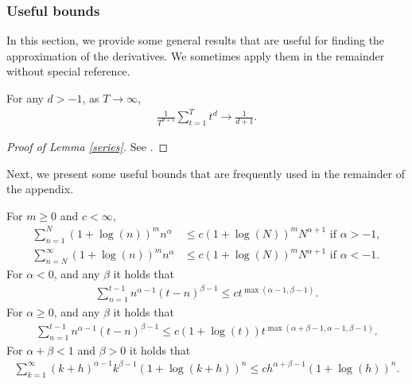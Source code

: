{{\subsubsection{Useful bounds}\label{UB} 
In this section, we provide some general results that are useful for finding the approximation of the derivatives. We sometimes apply them in the remainder without special reference.

\begin{lemma} \label{series}
    For any $d>-1$, as $T\rightarrow \infty$,
    \begin{align}
        \frac{1}{T^{d+1}} \sum_{t = 1}^T t^d \rightarrow \frac{1}{d+1}.\label{series1}
    \end{align}
\end{lemma}
\begin{proof}[Proof of Lemma \ref{series}] See \textcite[Lemma S.10]{hualde2020truncated}. 
\end{proof}



Next, we present some useful bounds that are frequently used in the remainder of the appendix.

\begin{lemma} \label{genbounds}
For $m \geq 0$ and $c < \infty$, 
\begin{align}
    \sum_{n = 1}^N (1+\log(n))^m n^{\alpha} &\leq c (1+\log(N))^m N^{\alpha + 1} \text{ if } \alpha > -1, \label{lA1} \\
    \sum_{n = N}^{\infty} (1+\log(n))^m n^{\alpha} &\leq c (1+\log(N))^m N^{\alpha + 1} \text{ if } \alpha < -1.\label{lA2}
\end{align}
For $\alpha< 0$, and any $\beta$ it holds that 
\begin{align}
    \sum_{n = 1}^{t-1} n^{\alpha-1} (t-n)^{\beta - 1} \leq c t^{\max(\alpha-1,\beta-1)}. \label{lA3}
\end{align}
For $\alpha\geq 0$, and any $\beta$ it holds that 
\begin{align}
    \sum_{n = 1}^{t-1} n^{\alpha-1} (t-n)^{\beta - 1} \leq c (1 + \log(t)) t^{\max(\alpha+\beta-1,\alpha-1,\beta-1)}. \label{lA4}
\end{align}
For $\alpha+\beta < 1$ and $\beta > 0$ it holds that 
\begin{align}
    \sum_{k = 1}^{\infty} (k+h)^{\alpha-1} k^{\beta-1} (1+\log(k+h))^n \leq c h^{\alpha+\beta-1} (1+\log(h))^n. \label{lA5}
\end{align}


\end{lemma}}}
